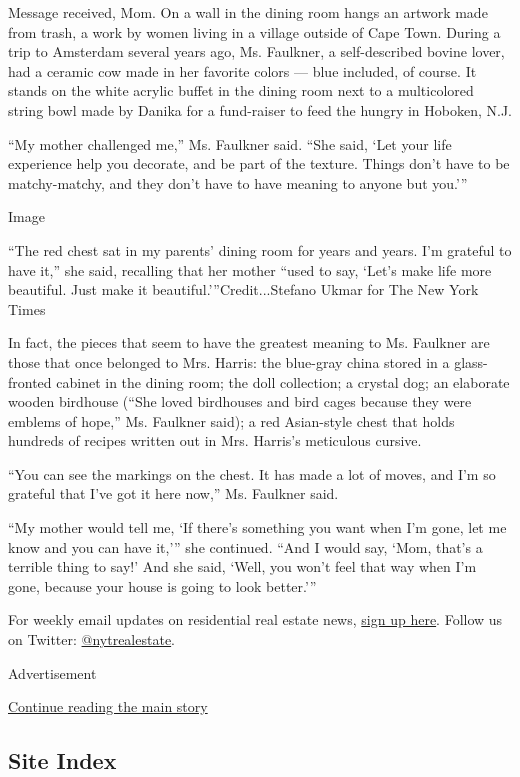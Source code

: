 Message received, Mom. On a wall in the dining room hangs an artwork
made from trash, a work by women living in a village outside of Cape
Town. During a trip to Amsterdam several years ago, Ms. Faulkner, a
self-described bovine lover, had a ceramic cow made in her favorite
colors --- blue included, of course. It stands on the white acrylic
buffet in the dining room next to a multicolored string bowl made by
Danika for a fund-raiser to feed the hungry in Hoboken, N.J.

``My mother challenged me,'' Ms. Faulkner said. ``She said, `Let your
life experience help you decorate, and be part of the texture. Things
don't have to be matchy-matchy, and they don't have to have meaning to
anyone but you.'''

Image

``The red chest sat in my parents' dining room for years and years. I'm
grateful to have it,'' she said, recalling that her mother ``used to
say, `Let's make life more beautiful. Just make it
beautiful.'''Credit...Stefano Ukmar for The New York Times

In fact, the pieces that seem to have the greatest meaning to Ms.
Faulkner are those that once belonged to Mrs. Harris: the blue-gray
china stored in a glass-fronted cabinet in the dining room; the doll
collection; a crystal dog; an elaborate wooden birdhouse (``She loved
birdhouses and bird cages because they were emblems of hope,'' Ms.
Faulkner said); a red Asian-style chest that holds hundreds of recipes
written out in Mrs. Harris's meticulous cursive.

``You can see the markings on the chest. It has made a lot of moves, and
I'm so grateful that I've got it here now,'' Ms. Faulkner said.

``My mother would tell me, `If there's something you want when I'm gone,
let me know and you can have it,''' she continued. ``And I would say,
`Mom, that's a terrible thing to say!' And she said, `Well, you won't
feel that way when I'm gone, because your house is going to look
better.'''

For weekly email updates on residential real estate news,
\href{http://www.nytimes3xbfgragh.onion/newsletters/realestate/}{sign up
here}. Follow us on Twitter:
\href{https://twitter.com/nytrealestate}{@nytrealestate}.

Advertisement

\protect\hyperlink{after-bottom}{Continue reading the main story}

\hypertarget{site-index}{%
\subsection{Site Index}\label{site-index}}

